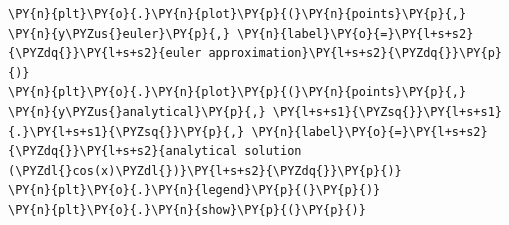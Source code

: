     \begin{tcolorbox}[breakable, size=fbox, boxrule=1pt, pad at break*=1mm,colback=cellbackground, colframe=cellborder]
\begin{Verbatim}[commandchars=\\\{\}]
\PY{n}{plt}\PY{o}{.}\PY{n}{plot}\PY{p}{(}\PY{n}{points}\PY{p}{,} \PY{n}{y\PYZus{}euler}\PY{p}{,} \PY{n}{label}\PY{o}{=}\PY{l+s+s2}{\PYZdq{}}\PY{l+s+s2}{euler approximation}\PY{l+s+s2}{\PYZdq{}}\PY{p}{)}
\PY{n}{plt}\PY{o}{.}\PY{n}{plot}\PY{p}{(}\PY{n}{points}\PY{p}{,} \PY{n}{y\PYZus{}analytical}\PY{p}{,} \PY{l+s+s1}{\PYZsq{}}\PY{l+s+s1}{.}\PY{l+s+s1}{\PYZsq{}}\PY{p}{,} \PY{n}{label}\PY{o}{=}\PY{l+s+s2}{\PYZdq{}}\PY{l+s+s2}{analytical solution (\PYZdl{}cos(x)\PYZdl{})}\PY{l+s+s2}{\PYZdq{}}\PY{p}{)}
\PY{n}{plt}\PY{o}{.}\PY{n}{legend}\PY{p}{(}\PY{p}{)}
\PY{n}{plt}\PY{o}{.}\PY{n}{show}\PY{p}{(}\PY{p}{)}
\end{Verbatim}
\end{tcolorbox}

    \begin{center}
    \end{center}
    { \hspace*{\fill} \\}
    

    
    
    
